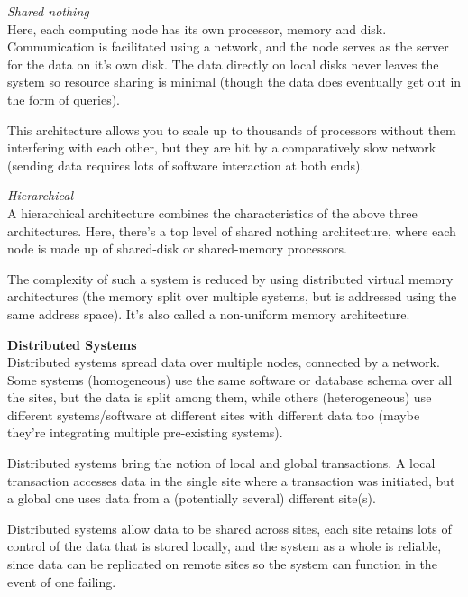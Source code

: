 \begin{description}
\begin{description}
      \item \textit{Shared nothing}\\
        Here, each computing node has its own processor, memory and disk.
        Communication is facilitated using a network, and the node serves as the
        server for the data on it's own disk. The data directly on local disks
        never leaves the system so resource sharing is minimal (though the data
        does eventually get out in the form of queries).

        This architecture allows you to scale up to thousands of processors
        without them interfering with each other, but they are hit by a
        comparatively slow network (sending data requires lots of software
        interaction at both ends).

      \item \textit{Hierarchical}\\
        A hierarchical architecture combines the characteristics of the above
        three architectures. Here, there's a top level of shared nothing
        architecture, where each node is made up of shared-disk or shared-memory
        processors.

        The complexity of such a system is reduced by using distributed virtual
        memory architectures (the memory split over multiple systems, but is
        addressed using the same address space). It's also called a non-uniform
        memory architecture.

    \end{description}

  \item \textbf{Distributed Systems}\\

    Distributed systems spread data over multiple nodes, connected by a network.
    Some systems (homogeneous) use the same software or database schema over all
    the sites, but the data is split among them, while others (heterogeneous)
    use different systems/software at different sites with different data too
    (maybe they're integrating multiple pre-existing systems).

    Distributed systems bring the notion of local and global transactions. A
    local transaction accesses data in the single site where a transaction was
    initiated, but a global one uses data from a (potentially several) different
    site(s).

    Distributed systems allow data to be shared across sites, each site retains
    lots of control of the data that is stored locally, and the system as a
    whole is reliable, since data can be replicated on remote sites so the
    system can function in the event of one failing.


\end{description}
